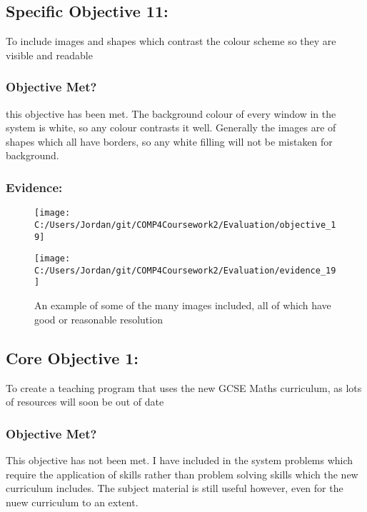 \subsection{Specific Objective 11: }

To include images and shapes which contrast the colour scheme so they are visible and readable

\subsubsection{Objective Met?}

this objective has been met. The background colour of every window in the system is white, so any colour contrasts it well. Generally the images are of shapes which all have borders, so any white filling will not be mistaken for background.

\subsubsection{Evidence: }

\begin{figure}[H]
	\texttt{[image: C:/Users/Jordan/git/COMP4Coursework2/Evaluation/objective\_19]}
\end{figure}

\begin{figure}[H]
	\texttt{[image: C:/Users/Jordan/git/COMP4Coursework2/Evaluation/evidence\_19]}
	\caption{An example of some of the many images included, all of which have good or reasonable resolution}
\end{figure}

\subsection{Core Objective 1: }

To create a teaching program that uses the new GCSE Maths curriculum, as lots of resources will soon be out of date

\subsubsection{Objective Met?}

This objective has not been met. I have included in the system problems which require the application of skills rather than problem solving skills which the new curriculum includes. The subject material is still useful however, even for the nuew curriculum to an extent.

